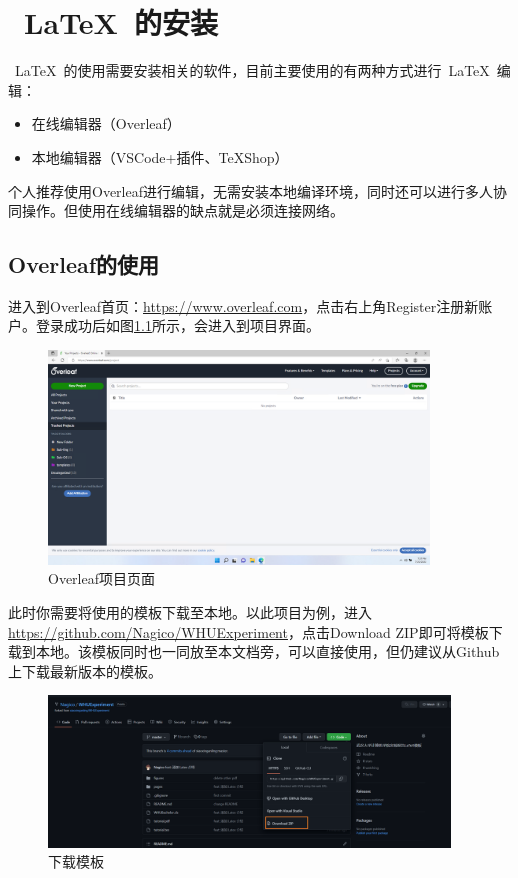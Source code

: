 \chapter{~\LaTeX~的安装}

~\LaTeX~的使用需要安装相关的软件，目前主要使用的有两种方式进行~\LaTeX~编辑：
\begin{itemize}
    \item 在线编辑器（Overleaf）
    \item 本地编辑器（VSCode+插件、TeXShop）
\end{itemize}

个人推荐使用Overleaf进行编辑，无需安装本地编译环境，同时还可以进行多人协同操作。但使用在线编辑器的缺点就是必须连接网络。

\section{Overleaf的使用}

进入到Overleaf首页：\url{https://www.overleaf.com}，点击右上角Register注册新账户。登录成功后如图\ref{fig:1-overlead-home}所示，会进入到项目界面。

\begin{figure}[htb]
    \centering
    \includegraphics[width=0.9\textwidth]{figures/chapter2/overleaf-home.png}
    \caption{Overleaf项目页面}
    \label{fig:1-overlead-home}
\end{figure}

此时你需要将使用的模板下载至本地。以此项目为例，进入\url{https://github.com/Nagico/WHUExperiment}，点击Download ZIP即可将模板下载到本地。该模板同时也一同放至本文档旁，可以直接使用，但仍建议从Github上下载最新版本的模板。

\begin{figure}[htb]
    \centering
    \includegraphics[width=0.95\textwidth]{figures/chapter2/download-repo.png}
    \caption{下载模板}
    \label{fig:1-github-download}
\end{figure}


